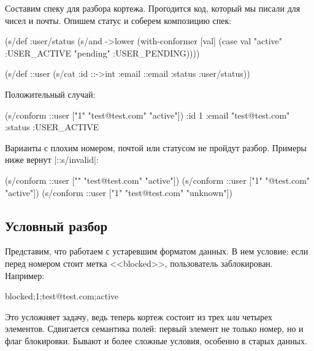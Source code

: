Составим спеку для разбора кортежа. Прогодится код, который мы писали для чисел
и почты. Опишем статус и соберем композицию спек:

\begin{english}
  \begin{clojure}
(s/def :user/status
  (s/and ->lower
         (with-conformer [val]
           (case val
             "active"  :USER_ACTIVE
             "pending" :USER_PENDING))))

(s/def ::user
  (s/cat :id ::->int
         :email ::email
         :status :user/status))
  \end{clojure}
\end{english}

\noindent
Положительный случай:

\begin{english}
  \begin{clojure}
(s/conform ::user ["1" "test@test.com" "active"])
{:id 1
 :email "test@test.com"
 :status :USER_ACTIVE}
  \end{clojure}
\end{english}

Варианты с плохим номером, почтой или статусом не пройдут разбор. Примеры ниже
вернут \spverb|::s/invalid|:

\begin{english}
  \begin{clojure}
(s/conform ::user ["" "test@test.com" "active"])
(s/conform ::user ["1" "@test.com" "active"])
(s/conform ::user ["1" "test@test.com" "unknown"])
  \end{clojure}
\end{english}

\subsection{Условный разбор}

Представим, что работаем с устаревшим форматом данных. В нем условие: если перед
номером стоит метка <<blocked>>, пользователь заблокирован. Например:

\begin{english}
  \begin{text}
blocked;1;test@test.com;active
  \end{text}
\end{english}

Это усложняет задачу, ведь теперь кортеж состоит из трех \emph{или} четырех
элементов. Сдвигается семантика полей: первый элемент не только номер, но и флаг
блокировки. Бывают и более сложные условия, особенно в старых данных.

